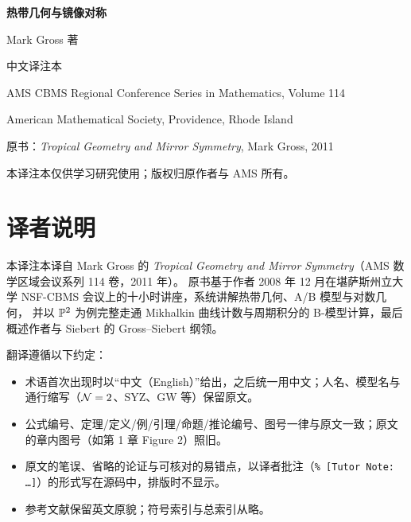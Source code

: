 
\thispagestyle{empty}
\begin{center}
\vspace*{3cm}
{\Huge\bfseries 热带几何与镜像对称\par}
\vspace{1.2cm}
{\Large Mark Gross 著\par}
\vspace{0.6cm}
{\large 中文译注本\par}
\vspace{2cm}
{\small AMS CBMS Regional Conference Series in Mathematics, Volume 114\par}
\vspace{0.2cm}
{\small American Mathematical Society, Providence, Rhode Island\par}
\vspace{1.5cm}
{\small 原书：\textit{Tropical Geometry and Mirror Symmetry}, Mark Gross, 2011\par}
\vspace{0.3cm}
{\small 本译注本仅供学习研究使用；版权归原作者与 AMS 所有。\par}
\end{center}
\clearpage

\tableofcontents
\clearpage

\section*{译者说明}
本译注本译自 Mark Gross 的 \textit{Tropical Geometry and Mirror Symmetry}（AMS 数学区域会议系列 114 卷，2011 年）。
原书基于作者 2008 年 12 月在堪萨斯州立大学 NSF-CBMS 会议上的十小时讲座，系统讲解热带几何、A/B 模型与对数几何，
并以 $\mathbb{P}^2$ 为例完整走通 Mikhalkin 曲线计数与周期积分的 B-模型计算，最后概述作者与 Siebert 的 Gross--Siebert 纲领。

翻译遵循以下约定：
\begin{itemize}[leftmargin=1.6em,itemsep=1pt]
\item 术语首次出现时以“中文（English）”给出，之后统一用中文；人名、模型名与通行缩写（$\mathcal{N}=2$、SYZ、GW 等）保留原文。
\item 公式编号、定理/定义/例/引理/命题/推论编号、图号一律与原文一致；原文的章内图号（如第 1 章 Figure 2）照旧。
\item 原文的笔误、省略的论证与可核对的易错点，以译者批注（\verb|% [Tutor Note: …]|）的形式写在源码中，排版时不显示。
\item 参考文献保留英文原貌；符号索引与总索引从略。
\end{itemize}

